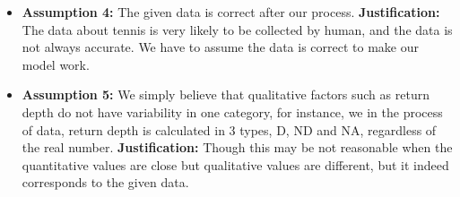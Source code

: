 \begin{itemize}
    \item \textbf{Assumption 4:} The given data is correct after our process.
    \textbf{Justification:} The data about tennis is very likely to be collected
    by human, and the data is not always accurate. We have to assume the data is correct to make our model work.

    \item \textbf{Assumption 5:} We simply believe that qualitative factors such as return depth do not have variability in one category, for instance, we 
    in the process of data, return depth is calculated in 3 types, D, ND and NA, regardless of the real number.
    \textbf{Justification:} Though this may be not reasonable when the quantitative values are close but qualitative values are different, but it indeed corresponds to the given data.
\end{itemize}
